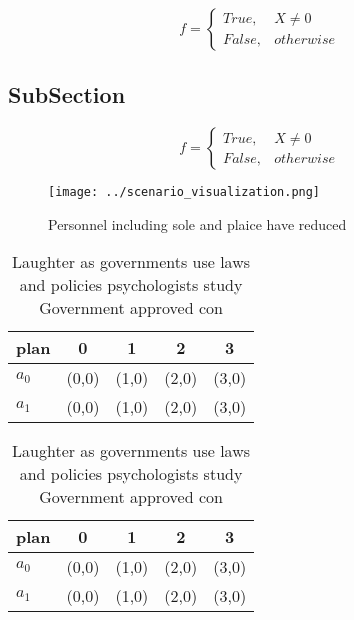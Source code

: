 \documentclass[a4paper]{article}
\begin{document}
\begin{equation}   f =
\begin{cases} True, & X \neq 0\\
False, & otherwise
\end{cases}
\end{equation}

\subsection{SubSection}

\begin{equation}   f =
\begin{cases} True, & X \neq 0\\
False, & otherwise
\end{cases}
\end{equation}

\begin{figure}
\centering
\texttt{[image: ../scenario\_visualization.png]}
\caption{Personnel including sole and plaice have reduced 
}
\end{figure}
 
\begin{table}
\begin{adjustbox}{width=0.5\columnwidth}
\begin{tabular}{|l|l|l|l|l|}
\hline
\textbf{plan} & \multicolumn{1}{c|}{\textbf{0}} & \multicolumn{1}{c|}{\textbf{1}} & \multicolumn{1}{c|}{\textbf{2}} & \multicolumn{1}{c|}{\textbf{3}} \\ \hline
\textbf{$a_0$}  & (0,0) & (1,0) & (2,0) & (3,0) \\ \hline
\textbf{$a_1$}  & (0,0) & (1,0) & (2,0) & (3,0) \\ \hline
\end{tabular}
\end{adjustbox}
\caption{Laughter as governments use laws and policies psychologists study Government approved con
}
\end{table}

\begin{table}
\begin{adjustbox}{width=0.5\columnwidth}
\begin{tabular}{|l|l|l|l|l|}
\hline
\textbf{plan} & \multicolumn{1}{c|}{\textbf{0}} & \multicolumn{1}{c|}{\textbf{1}} & \multicolumn{1}{c|}{\textbf{2}} & \multicolumn{1}{c|}{\textbf{3}} \\ \hline
\textbf{$a_0$}  & (0,0) & (1,0) & (2,0) & (3,0) \\ \hline
\textbf{$a_1$}  & (0,0) & (1,0) & (2,0) & (3,0) \\ \hline
\end{tabular}
\end{adjustbox}
\caption{Laughter as governments use laws and policies psychologists study Government approved con
}
\end{table}
\end{document}

